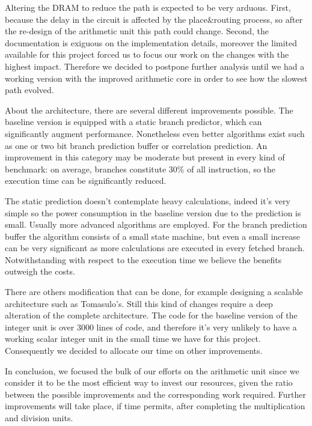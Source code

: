 Altering the DRAM to reduce the path is expected to be very arduous. First, because the delay in the circuit is affected by the place\&routing process, so after the re-design of the arithmetic unit this path could change. Second, the documentation is exiguous on the implementation details, moreover the limited available for this project forced us to focus our work on the changes with the highest impact. Therefore we decided to postpone further analysis until we had a working version with the improved arithmetic core in order to see how the slowest path evolved.

About the architecture, there are several different improvements possible.
The baseline version is equipped with a static branch predictor, which can significantly augment performance. Nonetheless even better algorithms exist such as one or two bit branch prediction buffer or correlation prediction.
An improvement in this category may be moderate but present in every kind of benchmark: on average, branches constitute 30\% of all instruction, so the execution time can be significantly reduced.

The static prediction doesn't contemplate heavy calculations, indeed it's very simple so the power consumption in the baseline version due to the prediction is small. Usually more advanced algorithms are employed. For the branch prediction buffer the algorithm consists of a small state machine, but even a small increase can be very significant as more calculations are executed in every fetched branch. Notwithstanding with respect to the execution time we believe the benefits outweigh the costs.

There are others modification that can be done, for example designing a scalable architecture such as Tomasulo's. Still this kind of changes require a deep alteration of the complete architecture. The code for the baseline version of the integer unit is over 3000 lines of code, and therefore it's very unlikely to have a working scalar integer unit in the small time we have for this project. Consequently we decided to allocate our time on other improvements.

In conclusion, we focused the bulk of our efforts on the arithmetic unit since we consider it to be the most efficient way to invest our resources, given the ratio between the possible improvements and the corresponding work required. Further improvements will take place, if time permits, after completing the multiplication and division units.
